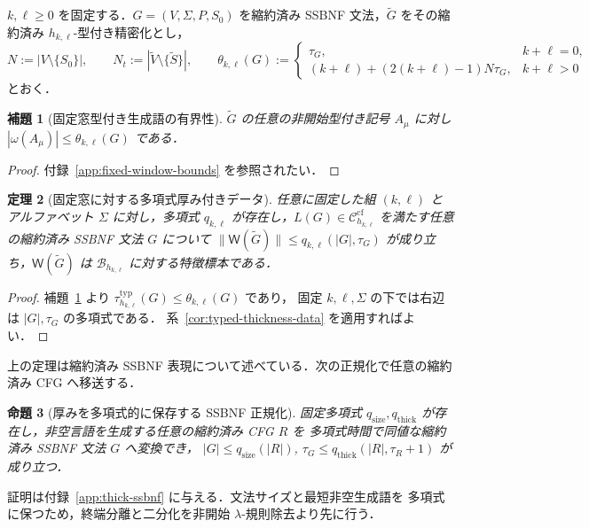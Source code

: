 \documentclass[11pt,a4paper]{ltjsarticle}
\newtheorem{theorem}{定理}[section]
\newtheorem{lemma}[theorem]{補題}
\newtheorem{proposition}[theorem]{命題}
\theoremstyle{remark}
\theoremstyle{plain}
\newcommand{\WitnessSet}{\mathsf{W}}
\newcommand{\cf}{\mathrm{cf}}
\newcommand{\Ccf}[1]{\mathcal C_{#1}^{\cf}}
\begin{document}
$k,\ell\ge0$ を固定する．$G=(V,\Sigma,P,S_0)$ を縮約済み
SSBNF 文法，$\widetilde G$ をその縮約済み $h_{k,\ell}$-型付き精密化とし，
\[
 N:=|V\setminus\{S_0\}|,\qquad
 N_t:=|\widetilde V\setminus\{\widetilde S\}|,\qquad
 \theta_{k,\ell}(G):=
 \begin{cases}
   \tau_G, & k+\ell=0,\\[1mm]
   (k+\ell)+(2(k+\ell)-1)N\tau_G, & k+\ell>0
 \end{cases}
\]
とおく．

\begin{lemma}[固定窓型付き生成語の有界性]
\label{lem:window-typed-yield}
$\widetilde G$ の任意の非開始型付き記号 $A_\mu$ に対し
$|\omega(A_\mu)|\le\theta_{k,\ell}(G)$
である．
\end{lemma}
\begin{proof}
付録~\ref{app:fixed-window-bounds} を参照されたい．
\end{proof}

\begin{theorem}[固定窓に対する多項式厚み付きデータ]
\label{thm:window-thick}
任意に固定した組 $(k,\ell)$ とアルファベット $\Sigma$ に対し，多項式
$q_{k,\ell}$ が存在し，$L(G)\in\Ccf{h_{k,\ell}}$ を満たす任意の縮約済み
SSBNF 文法 $G$ について
$\|\WitnessSet(\widetilde G)\| \le q_{k,\ell}(|G|,\tau_G)$
が成り立ち，$\WitnessSet(\widetilde G)$ は
$\mathcal B_{h_{k,\ell}}$ に対する特徴標本である．
\end{theorem}
\begin{proof}
補題~\ref{lem:window-typed-yield} より
$\tau_{h_{k,\ell}}^{\mathrm{typ}}(G)\le\theta_{k,\ell}(G)$ であり，
固定 $k,\ell,\Sigma$ の下では右辺は $|G|,\tau_G$ の多項式である．
系~\ref{cor:typed-thickness-data} を適用すればよい．
\end{proof}

上の定理は縮約済み SSBNF 表現について述べている．次の正規化で任意の縮約済み
CFG へ移送する．

\begin{proposition}[厚みを多項式的に保存する SSBNF 正規化]
\label{prop:thick-ssbnf-normal}
固定多項式 $q_{\mathrm{size}},q_{\mathrm{thick}}$ が存在し，非空言語を生成する任意の縮約済み CFG $R$ を
多項式時間で同値な縮約済み SSBNF 文法 $G$ へ変換でき，
$|G|\le q_{\mathrm{size}}(|R|)$,
$\tau_G\le q_{\mathrm{thick}}(|R|,\tau_R+1)$
が成り立つ．
\end{proposition}

証明は付録~\ref{app:thick-ssbnf} に与える．文法サイズと最短非空生成語を
多項式に保つため，終端分離と二分化を非開始 $\lambda$-規則除去より先に行う．
\end{document}
